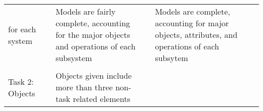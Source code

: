\documentclass[]{article}
\begin{document}
\begin{longtable}[]{@{}lllllll@{}}
\begin{minipage}[t]{0.16\columnwidth}
for each system\strut
\end{minipage} & \begin{minipage}[t]{0.03\columnwidth}\raggedright
\strut
\end{minipage} & \begin{minipage}[t]{0.19\columnwidth}\raggedright
Models are fairly complete, accounting for the major objects and
operations of each subsystem\strut
\end{minipage} & \begin{minipage}[t]{0.03\columnwidth}\raggedright
\strut
\end{minipage} & \begin{minipage}[t]{0.20\columnwidth}\raggedright
Models are complete, accounting for major objects, attributes, and
operations of each subsytem\strut
\end{minipage}\tabularnewline
\begin{minipage}[t]{0.19\columnwidth}\raggedright
\strut
\end{minipage} & \begin{minipage}[t]{0.03\columnwidth}\raggedright
\strut
\end{minipage} & \begin{minipage}[t]{0.16\columnwidth}\raggedright
\strut
\end{minipage} & \begin{minipage}[t]{0.03\columnwidth}\raggedright
\strut
\end{minipage} & \begin{minipage}[t]{0.19\columnwidth}\raggedright
\strut
\end{minipage} & \begin{minipage}[t]{0.03\columnwidth}\raggedright
\strut
\end{minipage} & \begin{minipage}[t]{0.20\columnwidth}\raggedright
\strut
\end{minipage}\tabularnewline
\begin{minipage}[t]{0.19\columnwidth}\raggedright
Task 2: Objects\strut
\end{minipage} & \begin{minipage}[t]{0.03\columnwidth}\raggedright
\strut
\end{minipage} & \begin{minipage}[t]{0.16\columnwidth}\raggedright
Objects given include more than three non-task related elements\strut
\end{minipage} & \begin{minipage}[t]{0.03\columnwidth}\raggedright

\end{minipage}
\end{longtable}
\end{document}
